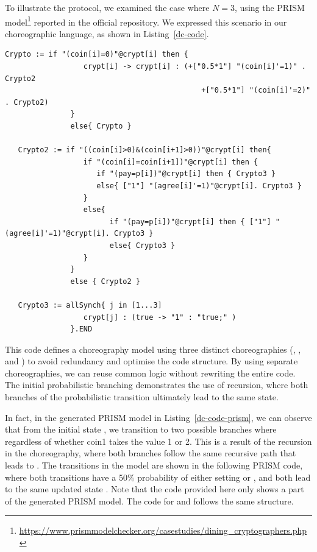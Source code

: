 To illustrate the protocol, we examined the case where $N=3$, using the PRISM model\footnote{\url{https://www.prismmodelchecker.org/casestudies/dining_cryptographers.php}} reported in the official repository. We expressed this scenario in our choreographic language, as shown in Listing~\ref{dc-code}.
\begin{lstlisting}[style=chor-color,caption={Choreography for the Dining Cryptographers Protocol},captionpos=b,label={dc-code}]
   Crypto := if "(coin[i]=0)"@crypt[i] then {
                  crypt[i] -> crypt[i] : (+["0.5*1"] "(coin[i]'=1)" . Crypto2
                                             +["0.5*1"] "(coin[i]'=2)" . Crypto2) 
               }
               else{ Crypto }

   Crypto2 := if "((coin[i]>0)&(coin[i+1]>0))"@crypt[i] then{
                  if "(coin[i]=coin[i+1])"@crypt[i] then {
                     if "(pay=p[i])"@crypt[i] then { Crypto3 }
                     else{ ["1"] "(agree[i]'=1)"@crypt[i]. Crypto3 }
                  }
                  else{
                        if "(pay=p[i])"@crypt[i] then { ["1"] "(agree[i]'=1)"@crypt[i]. Crypto3 }
                        else{ Crypto3 }
                  }
               }
               else { Crypto2 }

   Crypto3 := allSynch{ j in [1...3]
                  crypt[j] : (true -> "1" : "true;" )
               }.END
\end{lstlisting}
This code defines a choreography model using three distinct choreographies (, , and ) to avoid redundancy and optimise the code structure. By using separate choreographies, we can reuse common logic without rewriting the entire code.
The initial probabilistic branching demonstrates the use of recursion, where both branches of the probabilistic transition ultimately lead to the same state. 

In fact, in the generated PRISM model in Listing~\ref{dc-code-prism}, we can observe that from the initial state , we transition to two possible branches where  regardless of whether coin1 takes the value 1 or 2. This is a result of the recursion in the choreography, where both branches follow the same recursive path that leads to . The transitions in the model are shown in the following PRISM code, where both transitions have a 50$\%$ probability of either setting  or , and both lead to the same updated state . Note that the code provided here only shows a part of the generated PRISM model. The code for  and  follows the same structure.

